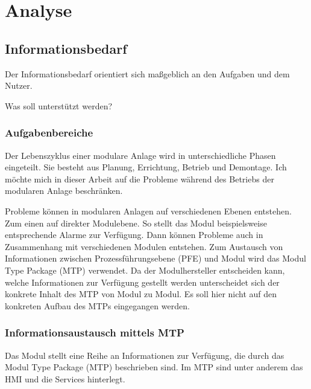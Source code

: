 
\chapter{Analyse}
\label{sec:Anforderungsanalyse}

\section{Informationsbedarf}
Der Informationsbedarf orientiert sich maßgeblich an den Aufgaben und dem Nutzer.

Was soll unterstützt werden?

\subsection{Aufgabenbereiche}
Der Lebenszyklus einer modulare Anlage wird in unterschiedliche Phasen eingeteilt. Sie besteht aus Planung, Errichtung, Betrieb und Demontage. \cite{} Ich möchte mich in dieser Arbeit auf die Probleme während des Betriebs der modularen Anlage beschränken. 

Probleme können in modularen Anlagen auf verschiedenen Ebenen entstehen. Zum einen auf direkter Modulebene. So stellt das Modul beispielsweise entsprechende Alarme zur Verfügung. Dann können Probleme auch in Zusammenhang mit verschiedenen Modulen entstehen. Zum Austausch von Informationen zwischen Prozessführungsebene (PFE) und Modul wird das Modul Type Package (MTP) verwendet. Da der Modulhersteller entscheiden kann, welche Informationen zur Verfügung gestellt werden unterscheidet sich der konkrete Inhalt des MTP von Modul zu Modul. Es soll hier nicht auf den konkreten Aufbau des MTPs eingegangen werden.

\subsection{Informationsaustausch mittels MTP}
Das Modul stellt eine Reihe an Informationen zur Verfügung, die durch das Modul Type Package (MTP) beschrieben sind. Im MTP sind unter anderem das HMI und die Services hinterlegt.

